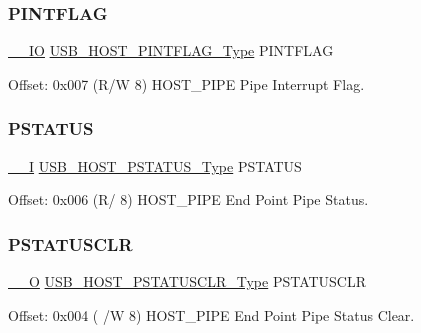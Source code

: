 \subsubsection{\texorpdfstring{PINTFLAG}{PINTFLAG}}
{\footnotesize\ttfamily \mbox{\hyperlink{core__cm0plus_8h_aec43007d9998a0a0e01faede4133d6be}{\+\_\+\+\_\+\+IO}} \mbox{\hyperlink{union_u_s_b___h_o_s_t___p_i_n_t_f_l_a_g___type}{U\+S\+B\+\_\+\+H\+O\+S\+T\+\_\+\+P\+I\+N\+T\+F\+L\+A\+G\+\_\+\+Type}} P\+I\+N\+T\+F\+L\+AG}



Offset\+: 0x007 (R/W 8) H\+O\+S\+T\+\_\+\+P\+I\+PE Pipe Interrupt Flag. 

\mbox{\label{struct_usb_host_pipe_adc9985facd8dc67ac81e06b89b407fed}} 
\subsubsection{\texorpdfstring{PSTATUS}{PSTATUS}}
{\footnotesize\ttfamily \mbox{\hyperlink{core__cm0plus_8h_af63697ed9952cc71e1225efe205f6cd3}{\+\_\+\+\_\+I}} \mbox{\hyperlink{union_u_s_b___h_o_s_t___p_s_t_a_t_u_s___type}{U\+S\+B\+\_\+\+H\+O\+S\+T\+\_\+\+P\+S\+T\+A\+T\+U\+S\+\_\+\+Type}} P\+S\+T\+A\+T\+US}



Offset\+: 0x006 (R/ 8) H\+O\+S\+T\+\_\+\+P\+I\+PE End Point Pipe Status. 

\mbox{\label{struct_usb_host_pipe_a39bc5cb8cb76ecb010c9608521f9eb65}} 
\subsubsection{\texorpdfstring{PSTATUSCLR}{PSTATUSCLR}}
{\footnotesize\ttfamily \mbox{\hyperlink{core__cm0plus_8h_a7e25d9380f9ef903923964322e71f2f6}{\+\_\+\+\_\+O}} \mbox{\hyperlink{union_u_s_b___h_o_s_t___p_s_t_a_t_u_s_c_l_r___type}{U\+S\+B\+\_\+\+H\+O\+S\+T\+\_\+\+P\+S\+T\+A\+T\+U\+S\+C\+L\+R\+\_\+\+Type}} P\+S\+T\+A\+T\+U\+S\+C\+LR}



Offset\+: 0x004 ( /W 8) H\+O\+S\+T\+\_\+\+P\+I\+PE End Point Pipe Status Clear. 

\mbox{\label{struct_usb_host_pipe_a9763934dd6581bc0e02ab231daf490a8}} 
